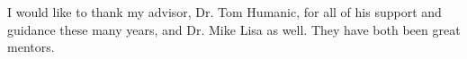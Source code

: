 \begin{acknowledgments}

I would like to thank my advisor, Dr. Tom Humanic, for all of his support and guidance these many years, and Dr. Mike Lisa as well.
They have both been great mentors.



\end{acknowledgments}
